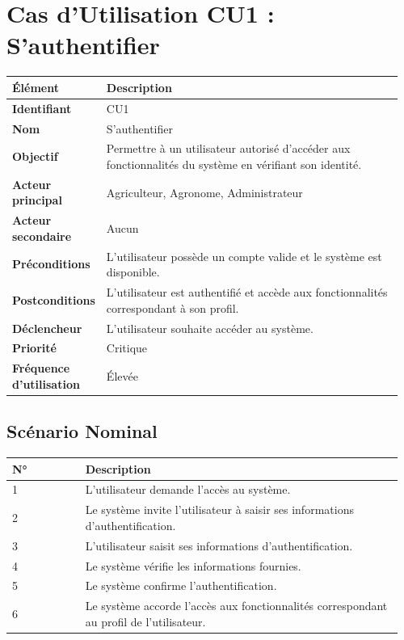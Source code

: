 \hypertarget{cas-dutilisation-cu1-sauthentifier}{%
\section{Cas d'Utilisation CU1 :
S'authentifier}\label{cas-dutilisation-cu1-sauthentifier}}

\begin{longtable}{@{}p{0.18\linewidth}p{0.78\linewidth}@{}}
\toprule
\rowcolors{2}{gray!10}{white}
\textbf{Élément} & \textbf{Description} \\
\midrule
\endhead
\textbf{Identifiant} & CU1 \\
\textbf{Nom} & S'authentifier \\
\textbf{Objectif} & Permettre à un utilisateur autorisé d'accéder aux
fonctionnalités du système en vérifiant son identité. \\
\textbf{Acteur principal} & Agriculteur, Agronome, Administrateur \\
\textbf{Acteur secondaire} & Aucun \\
\textbf{Préconditions} & L'utilisateur possède un compte valide et le
système est disponible. \\
\textbf{Postconditions} & L'utilisateur est authentifié et accède aux
fonctionnalités correspondant à son profil. \\
\textbf{Déclencheur} & L'utilisateur souhaite accéder au système. \\
\textbf{Priorité} & Critique \\
\textbf{Fréquence d'utilisation} & Élevée \\
\bottomrule
\end{longtable}

\hypertarget{scuxe9nario-nominal}{%
\subsection{Scénario Nominal}\label{scuxe9nario-nominal}}

\begin{longtable}{@{}p{0.18\linewidth}p{0.78\linewidth}@{}}
\toprule
\rowcolors{2}{gray!10}{white}
\textbf{N°} & \textbf{Description} \\
\midrule
\endhead
1 & L'utilisateur demande l'accès au système. \\
2 & Le système invite l'utilisateur à saisir ses informations
d'authentification. \\
3 & L'utilisateur saisit ses informations d'authentification. \\
4 & Le système vérifie les informations fournies. \\
5 & Le système confirme l'authentification. \\
6 & Le système accorde l'accès aux fonctionnalités correspondant au
profil de l'utilisateur. \\
\bottomrule
\end{longtable}

